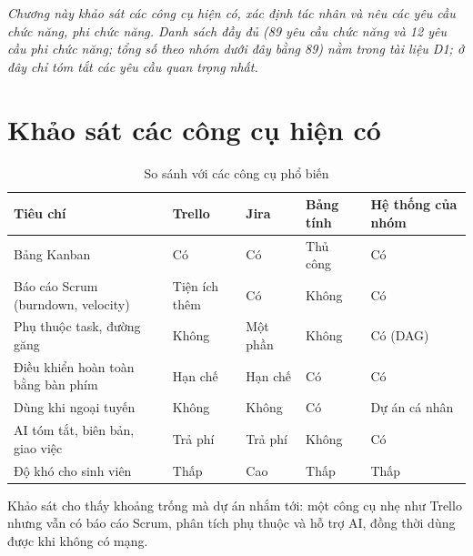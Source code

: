 \documentclass[../main.tex]{subfiles}
\begin{document}
\textit{Chương này khảo sát các công cụ hiện có, xác định tác nhân và nêu các yêu cầu chức năng,
phi chức năng. Danh sách đầy đủ (89 yêu cầu chức năng và 12 yêu cầu phi chức năng; tổng số theo
nhóm dưới đây bằng 89) nằm trong tài liệu D1; ở đây chỉ tóm tắt các yêu cầu quan trọng nhất.}

\section{Khảo sát các công cụ hiện có}
\begin{table}[H]
\centering
\caption{So sánh với các công cụ phổ biến}\label{tab:survey}
\renewcommand{\arraystretch}{1.25}
\begin{tabular}{|p{3.4cm}|p{1.9cm}|p{1.9cm}|p{2.3cm}|p{2.8cm}|}
\hline
\textbf{Tiêu chí} & \textbf{Trello} & \textbf{Jira} & \textbf{Bảng tính} & \textbf{Hệ thống của nhóm} \\ \hline
Bảng Kanban & Có & Có & Thủ công & Có \\ \hline
Báo cáo Scrum (burndown, velocity) & Tiện ích thêm & Có & Không & Có \\ \hline
Phụ thuộc task, đường găng & Không & Một phần & Không & Có (DAG) \\ \hline
Điều khiển hoàn toàn bằng bàn phím & Hạn chế & Hạn chế & Có & Có \\ \hline
Dùng khi ngoại tuyến & Không & Không & Có & Dự án cá nhân \\ \hline
AI tóm tắt, biên bản, giao việc & Trả phí & Trả phí & Không & Có \\ \hline
Độ khó cho sinh viên & Thấp & Cao & Thấp & Thấp \\ \hline
\end{tabular}
\end{table}

Khảo sát cho thấy khoảng trống mà dự án nhắm tới: một công cụ nhẹ như Trello nhưng vẫn có báo cáo
Scrum, phân tích phụ thuộc và hỗ trợ AI, đồng thời dùng được khi không có mạng.
\end{document}

